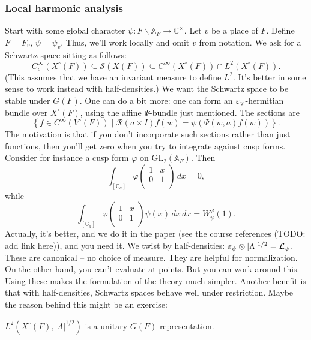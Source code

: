 \documentclass[reqno]{amsart} 
\numberwithin{theorem}{section}
\numberwithin{equation}{section}
\numberwithin{exercise}{section}
\begin{document}
\subsubsection{Local harmonic analysis}\label{sec:cq6tho3bu5}

Start with some global character $\psi : F \backslash \mathbb{A}_F \rightarrow \mathbb{C}^\times$.  Let $v$ be a place of $F$.  Define $F = F_v$, $\psi = \psi_v$.  Thus, we'll work locally and omit $v$ from notation.  We ask for a Schwartz space sitting as follows:
\begin{equation*}
  C_c^\infty(X^{\circ}(F)) \subseteq \mathcal{S}(X(F)) \subseteq C^\infty(X^{\circ}(F)) \cap L^2(X^{\circ}(F)).
\end{equation*}
(This assumes that we have an invariant measure to define $L^2$.  It's better in some sense to work instead with half-densities.)  We want the Schwartz space to be stable under $G(F)$.  One can do a bit more: one can form an $\varepsilon_\psi$-hermitian bundle over $X^{\circ}(F)$, using the affine $\Psi$-bundle just mentioned.  The sections are
\begin{equation*}
  \left\{ f \in C^\infty(V^{\circ}(F)) \mid \mathcal{R}(a \times I) f(w) = \psi(\Psi(w, a) f(w)) \right\}.
\end{equation*}
The motivation is that if you don't incorporate such sections rather than just functions, then you'll get zero when you try to integrate against cusp forms.  Consider for instance a cusp form $\varphi$ on $\mathrm{GL}_2(\mathbb{A}_F)$.  Then
\begin{equation*}
  \int_{[\mathbb{G}_a]} \varphi
  \begin{pmatrix}
    1 & x \\
    0 & 1 \\
  \end{pmatrix} \, d x= 0,
\end{equation*}
while
\begin{equation*}
  \int_{[\mathbb{G}_a]} \varphi
  \begin{pmatrix}
    1 & x \\
    0 & 1 \\
  \end{pmatrix}
  \psi(x) \, d x
  \, d x
  =
  W_\psi^\varphi(1).
\end{equation*}
Actually, it's better, and we do it in the paper (see the course references (TODO: add link here)), and you need it.  We twist by half-densities: $\varepsilon_\psi \otimes \lvert \Lambda \rvert^{1/2} = \mathcal{L}_\psi$.  These are canonical -- no choice of measure.  They are helpful for normalization.  On the other hand, you can't evaluate at points.  But you can work around this.  Using these makes the formulation of the theory much simpler.  Another benefit is that with half-densities, Schwartz spaces behave well under restriction.  Maybe the reason behind this might be an exercise:
\begin{exercise}\label{exercise:cq6tho3tag}
  $L^2(X^{\circ}(F), \lvert \Lambda \rvert^{1/2})$ is a unitary $G(F)$-representation.
\end{exercise}
\end{document}
